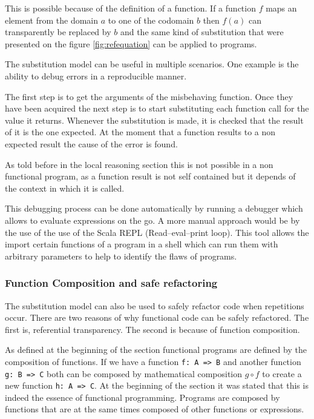\documentclass[../main.tex]{subfiles}
\begin{document}
This is possible because of the definition of a function. If a function $f$ maps an
element from the domain $a$ to one of the codomain $b$ then $f(a)$ can
transparently be replaced by $b$ and the same kind of substitution that were
presented on the figure \ref{fig:refequation} can be applied to programs.

The substitution model can be useful in multiple scenarios. One example is the
ability to debug errors in a reproducible manner.

The first step is to get the arguments of the misbehaving function. Once they have been acquired the next step is to
start substituting each function call for the value it returns. Whenever the
substitution is made, it is checked that the result of it is the one expected. At the
moment that a function results to a non expected result the cause of the error
is found.

As told before in the local reasoning section this is not possible in a non
functional program, as a function result is not self contained but it depends of
the context in which it is called.

This debugging process can be done automatically by running a debugger which allows to
evaluate expressions on the go. A more manual approach would be by the use of
the use of the Scala REPL (Read–eval–print loop). This tool allows the import
certain functions of a program in a shell which can run them with arbitrary
parameters to help to identify the flaws of programs.

\subsubsection{Function Composition and safe refactoring}

The substitution model can also be used to safely refactor code when repetitions
occur. There are two reasons of why functional code can be safely refactored.
The first is, referential transparency. The second is because of function
composition.

As defined at the beginning of the section functional programs are defined by
the composition of functions. If we have a function \texttt{f: A => B} and
another function \texttt{g: B => C} both can be composed by mathematical
composition $g \circ f$ to create a new function \texttt{h: A => C}. At the
beginning of the section it was stated that this is indeed the essence of
functional programming. Programs are composed by functions that are at the same
times composed of other functions or expressions.
\end{document}
